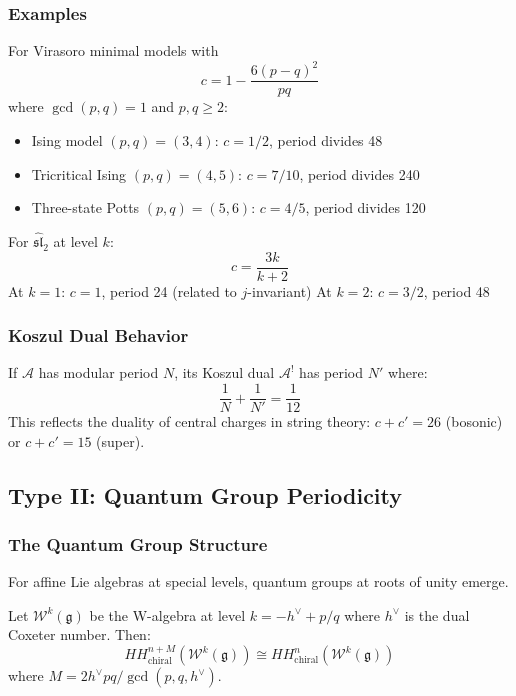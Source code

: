 \subsubsection{Examples}

\begin{example}
For Virasoro minimal models with 
\[
c = 1 - \frac{6(p-q)^2}{pq}
\]
where $\gcd(p,q) = 1$ and $p,q \geq 2$:

\begin{itemize}
\item Ising model $(p,q) = (3,4)$: $c = 1/2$, period divides 48
\item Tricritical Ising $(p,q) = (4,5)$: $c = 7/10$, period divides 240  
\item Three-state Potts $(p,q) = (5,6)$: $c = 4/5$, period divides 120
\end{itemize}
\end{example}

\begin{example}
For $\widehat{\mathfrak{sl}}_2$ at level $k$:
\[
c = \frac{3k}{k+2}
\]
At $k=1$: $c = 1$, period 24 (related to $j$-invariant)
At $k=2$: $c = 3/2$, period 48
\end{example}

\subsubsection{Koszul Dual Behavior}

\begin{theorem}
If $\mathcal{A}$ has modular period $N$, its Koszul dual $\mathcal{A}^!$ has period $N'$ where:
\[
\frac{1}{N} + \frac{1}{N'} = \frac{1}{12}
\]
This reflects the duality of central charges in string theory: $c + c' = 26$ (bosonic) or $c + c' = 15$ (super).
\end{theorem}

\subsection{Type II: Quantum Group Periodicity}

\subsubsection{The Quantum Group Structure}

For affine Lie algebras at special levels, quantum groups at roots of unity emerge.

\begin{theorem}
Let $\mathcal{W}^k(\mathfrak{g})$ be the W-algebra at level $k = -h^{\vee} + p/q$ where $h^{\vee}$ is the dual Coxeter number. Then:
\[
HH^{n+M}_{\text{chiral}}(\mathcal{W}^k(\mathfrak{g})) \cong HH^n_{\text{chiral}}(\mathcal{W}^k(\mathfrak{g}))
\]
where $M = 2h^{\vee}pq/\gcd(p,q,h^{\vee})$.
\end{theorem}

